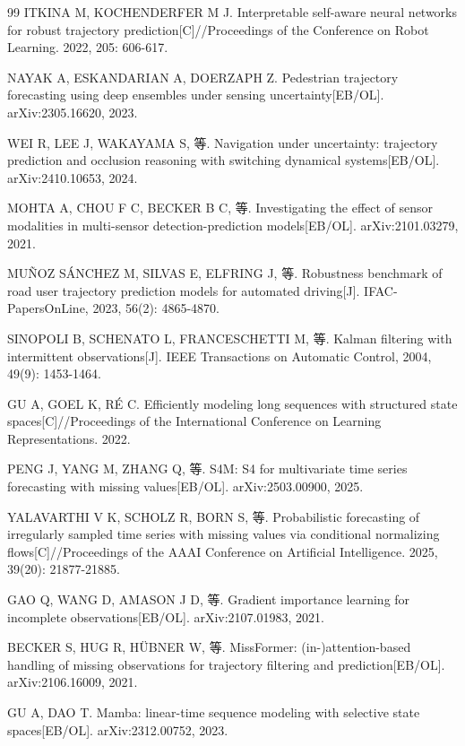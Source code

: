\begin{thebibliography}{99}
ITKINA M, KOCHENDERFER M J. Interpretable self-aware neural networks for robust trajectory prediction[C]//Proceedings of the Conference on Robot Learning. 2022, 205: 606-617.

NAYAK A, ESKANDARIAN A, DOERZAPH Z. Pedestrian trajectory forecasting using deep ensembles under sensing uncertainty[EB/OL]. arXiv:2305.16620, 2023.

WEI R, LEE J, WAKAYAMA S, 等. Navigation under uncertainty: trajectory prediction and occlusion reasoning with switching dynamical systems[EB/OL]. arXiv:2410.10653, 2024.

MOHTA A, CHOU F C, BECKER B C, 等. Investigating the effect of sensor modalities in multi-sensor detection-prediction models[EB/OL]. arXiv:2101.03279, 2021.

MUÑOZ SÁNCHEZ M, SILVAS E, ELFRING J, 等. Robustness benchmark of road user trajectory prediction models for automated driving[J]. IFAC-PapersOnLine, 2023, 56(2): 4865-4870.

SINOPOLI B, SCHENATO L, FRANCESCHETTI M, 等. Kalman filtering with intermittent observations[J]. IEEE Transactions on Automatic Control, 2004, 49(9): 1453-1464.

GU A, GOEL K, RÉ C. Efficiently modeling long sequences with structured state spaces[C]//Proceedings of the International Conference on Learning Representations. 2022.

PENG J, YANG M, ZHANG Q, 等. S4M: S4 for multivariate time series forecasting with missing values[EB/OL]. arXiv:2503.00900, 2025.

YALAVARTHI V K, SCHOLZ R, BORN S, 等. Probabilistic forecasting of irregularly sampled time series with missing values via conditional normalizing flows[C]//Proceedings of the AAAI Conference on Artificial Intelligence. 2025, 39(20): 21877-21885.

GAO Q, WANG D, AMASON J D, 等. Gradient importance learning for incomplete observations[EB/OL]. arXiv:2107.01983, 2021.

BECKER S, HUG R, HÜBNER W, 等. MissFormer: (in-)attention-based handling of missing observations for trajectory filtering and prediction[EB/OL]. arXiv:2106.16009, 2021.

GU A, DAO T. Mamba: linear-time sequence modeling with selective state spaces[EB/OL]. arXiv:2312.00752, 2023.


\end{thebibliography}
